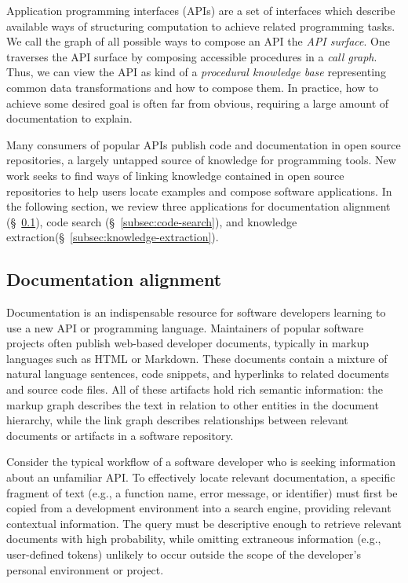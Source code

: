 \documentclass[12pt]{article}
\begin{document}
Application programming interfaces (APIs) are a set of interfaces which describe available ways of structuring computation to achieve related programming tasks. We call the graph of all possible ways to compose an API the \textit{API surface}. One traverses the API surface by composing accessible procedures in a \textit{call graph}. Thus, we can view the API as kind of a \textit{procedural knowledge base} representing common data transformations and how to compose them. In practice, how to achieve some desired goal is often far from obvious, requiring a large amount of documentation to explain.

Many consumers of popular APIs publish code and documentation in open source repositories, a largely untapped source of knowledge for programming tools. New work seeks to find ways of linking knowledge contained in open source repositories to help users locate examples and compose software applications. In the following section, we review three applications for documentation alignment (\S~\ref{subsec:tracelink}), code search (\S~\ref{subsec:code-search}), and knowledge extraction(\S~\ref{subsec:knowledge-extraction}).

\subsection{Documentation alignment}\label{subsec:tracelink}

Documentation is an indispensable resource for software developers learning to use a new API or programming language. Maintainers of popular software projects often publish web-based developer documents, typically in markup languages such as HTML or Markdown. These documents contain a mixture of natural language sentences, code snippets, and hyperlinks to related documents and source code files. All of these artifacts hold rich semantic information: the markup graph describes the text in relation to other entities in the document hierarchy, while the link graph describes relationships between relevant documents or artifacts in a software repository.

Consider the typical workflow of a software developer who is seeking information about an unfamiliar API. To effectively locate relevant documentation, a specific fragment of text (e.g., a function name, error message, or identifier) must first be copied from a development environment into a search engine, providing relevant contextual information. The query must be descriptive enough to retrieve relevant documents with high probability, while omitting extraneous information (e.g., user-defined tokens) unlikely to occur outside the scope of the developer's personal environment or project.
\end{document}
